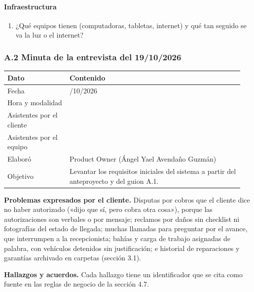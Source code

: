 \paragraph{Infraestructura}
\begin{enumerate}
\tightlist
\setcounter{enumi}{21}
\item ¿Qué equipos tienen (computadoras, tabletas, internet) y qué tan
seguido se va la luz o el internet?
\end{enumerate}

\subsubsection{A.2 Minuta de la entrevista del 19/10/2026}\label{anexo-a2}

{\small
\begin{longtable}[]{@{}
  >{\raggedright\arraybackslash}p{0.25\linewidth}
  >{\raggedright\arraybackslash}p{0.7\linewidth}@{}}
\toprule
\textbf{Dato} & \textbf{Contenido} \\
\midrule
\endhead
\bottomrule
\endlastfoot
Fecha & 19/10/2026 \\
Hora y modalidad & \pendiente{} \\
Asistentes por el cliente & \pendiente{} \\
Asistentes por el equipo & \pendiente{} \\
Elaboró & Product Owner (Ángel Yael Avendaño Guzmán) \\
Objetivo & Levantar los requisitos iniciales del sistema a partir del
anteproyecto y del guion A.1. \\
\end{longtable}
}

\textbf{Problemas expresados por el cliente.} Disputas por cobros que el
cliente dice no haber autorizado («dijo que sí, pero cobra otra cosa»),
porque las autorizaciones son verbales o por mensaje; reclamos por daños
sin checklist ni fotografías del estado de llegada; muchas llamadas para
preguntar por el avance, que interrumpen a la recepcionista; bahías y
carga de trabajo asignadas de palabra, con vehículos detenidos sin
justificación; e historial de reparaciones y garantías archivado en
carpetas (sección 3.1).

\textbf{Hallazgos y acuerdos.} Cada hallazgo tiene un identificador que
se cita como fuente en las reglas de negocio de la sección 4.7.

